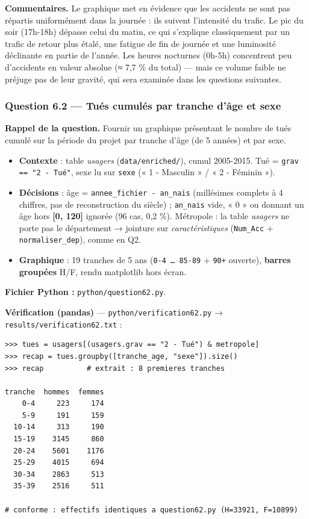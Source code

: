 \documentclass[11pt,a4paper]{article}
\newcommand{\rub}[2]{\textbf{\textcolor{#1}{#2}}}
\begin{document}
\rub{labcomment}{Commentaires.} Le graphique met en évidence que les accidents ne sont pas répartis uniformément dans la journée : ils suivent l'intensité du trafic. Le pic du soir (17h-18h) dépasse celui du matin, ce qui s'explique classiquement par un trafic de retour plus étalé, une fatigue de fin de journée et une luminosité déclinante en partie de l'année. Les heures nocturnes (0h-5h) concentrent peu d'accidents en valeur absolue (≈ 7,7 \% du total) — mais ce volume faible ne préjuge pas de leur gravité, qui sera examinée dans les questions suivantes.

\clearpage
\subsubsection*{Question 6.2 — Tués cumulés par tranche d'âge et sexe}

\rub{labrappel}{Rappel de la question.} Fournir un graphique présentant le nombre de tués cumulé sur la période du projet par tranche d'âge (de 5 années) et par sexe.

\begin{agentbox}
\begin{itemize}
\item \textbf{Contexte} : table \emph{usagers} (\texttt{data/enriched/}), cumul 2005-2015. Tué = \texttt{grav == "2 - Tué"}, sexe lu sur \texttt{sexe} (« 1 - Masculin » / « 2 - Féminin »).
\item \textbf{Décisions} : âge = \texttt{annee\_fichier - an\_nais} (millésimes complets à 4 chiffres, pas de reconstruction du siècle) ; \texttt{an\_nais} vide, « 0 » ou donnant un âge hors \textbf{[0, 120]} ignorée (96 cas, 0,2 \%). Métropole : la table \emph{usagers} ne porte pas le département → jointure sur \emph{caractéristiques} (\texttt{Num\_Acc} + \texttt{normaliser\_dep}), comme en Q2.
\item \textbf{Graphique} : 19 tranches de 5 ans (\texttt{0-4 … 85-89} + \texttt{90+} ouverte), \textbf{barres groupées} H/F, rendu matplotlib hors écran.
\end{itemize}
\end{agentbox}

\rub{labfichier}{Fichier Python :} \texttt{python/question62.py}.

\rub{labverif}{Vérification (pandas)} --- \texttt{python/verification62.py} → \texttt{results/verification62.txt} :

\begin{lstlisting}[style=pyblock]
>>> tues = usagers[(usagers.grav == "2 - Tué") & metropole]
>>> recap = tues.groupby([tranche_age, "sexe"]).size()
>>> recap          # extrait : 8 premieres tranches

tranche  hommes  femmes
    0-4     223     174
    5-9     191     159
  10-14     313     190
  15-19    3145     860
  20-24    5601    1176
  25-29    4015     694
  30-34    2863     513
  35-39    2516     511

# conforme : effectifs identiques a question62.py (H=33921, F=10899)
\end{lstlisting}
\end{document}
